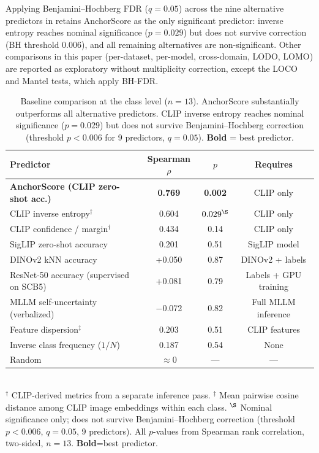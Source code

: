 \documentclass[11pt,a4paper]{article}
\begin{document}
Applying Benjamini--Hochberg FDR ($q=0.05$) across the nine alternative predictors in  retains AnchorScore as the only significant predictor: inverse entropy reaches nominal significance ($p=0.029$) but does not survive correction (BH threshold $0.006$), and all remaining alternatives are non-significant. Other comparisons in this paper (per-dataset, per-model, cross-domain, LODO, LOMO) are reported as exploratory without multiplicity correction, except the LOCO and Mantel tests, which apply BH-FDR.

\begin{table}[t]
\caption{Baseline comparison at the class level ($n=13$). AnchorScore substantially outperforms all alternative predictors. CLIP inverse entropy reaches nominal significance ($p=0.029$) but does not survive Benjamini--Hochberg correction (threshold $p<0.006$ for 9 predictors, $q=0.05$). \textbf{Bold} = best predictor.}
\label{tab:baselines}
\centering
\footnotesize
\begin{tabular}{lccc}
\toprule
\textbf{Predictor} & \textbf{Spearman} $\rho$ & $p$ & \textbf{Requires} \\
\midrule
\textbf{AnchorScore (CLIP zero-shot acc.)} & \textbf{0.769} & \textbf{0.002} & CLIP only \\
CLIP inverse entropy$^\dagger$ & 0.604 & $0.029^\S$ & CLIP only \\
CLIP confidence / margin$^\dagger$ & 0.434 & 0.14 & CLIP only \\
\midrule
SigLIP zero-shot accuracy & 0.201 & 0.51 & SigLIP model \\
DINOv2 kNN accuracy & +0.050 & 0.87 & DINOv2 + labels \\
ResNet-50 accuracy (supervised on SCB5) & +0.081 & 0.79 & Labels + GPU training \\
\midrule
MLLM self-uncertainty (verbalized) & $-$0.072 & 0.82 & Full MLLM inference \\
\midrule
Feature dispersion$^\ddagger$ & 0.203 & 0.51 & CLIP features \\
Inverse class frequency ($1/N$) & 0.187 & 0.54 & None \\
Random & $\approx 0$ & --- & --- \\
\bottomrule
\end{tabular}
\\[2pt]
\footnotesize{$^\dagger$ CLIP-derived metrics from a separate inference pass. $^\ddagger$ Mean pairwise cosine distance among CLIP image embeddings within each class. $^\S$ Nominal significance only; does not survive Benjamini--Hochberg correction (threshold $p<0.006$, $q=0.05$, 9 predictors). All $p$-values from Spearman rank correlation, two-sided, $n=13$. \textbf{Bold}=best predictor.}
\end{table}
\end{document}
